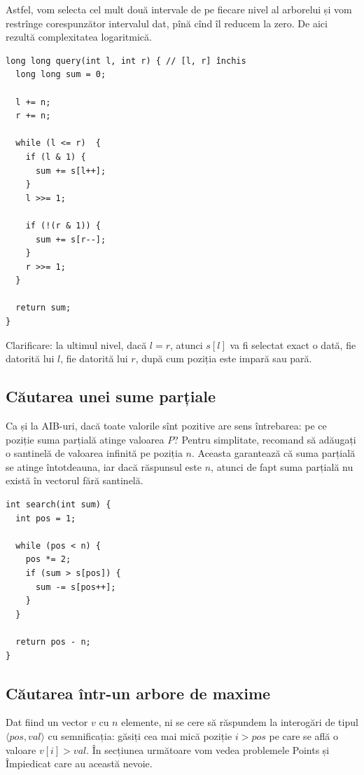 \documentclass[../main.tex]{subfiles}
\begin{document}
Astfel, vom selecta cel mult două intervale de pe fiecare nivel al arborelui și vom restrînge corespunzător intervalul dat, pînă cînd îl reducem la zero. De aici rezultă complexitatea logaritmică.

\begin{verbatim}
long long query(int l, int r) { // [l, r] închis
  long long sum = 0;

  l += n;
  r += n;

  while (l <= r)  {
    if (l & 1) {
      sum += s[l++];
    }
    l >>= 1;

    if (!(r & 1)) {
      sum += s[r--];
    }
    r >>= 1;
  }

  return sum;
}
\end{verbatim}

Clarificare: la ultimul nivel, dacă $l = r$, atunci $s[l]$ va fi selectat exact o dată, fie datorită lui $l$, fie datorită lui $r$, după cum poziția este impară sau pară.

\subsection{Căutarea unei sume parțiale}

Ca și la AIB-uri, dacă toate valorile sînt pozitive are sens întrebarea: pe ce poziție suma parțială atinge valoarea $P$? Pentru simplitate, recomand să adăugați o santinelă de valoarea infinită pe poziția $n$. Aceasta garantează că suma parțială se atinge întotdeauna, iar dacă răspunsul este $n$, atunci de fapt suma parțială nu există în vectorul fără santinelă.

\begin{verbatim}
int search(int sum) {
  int pos = 1;

  while (pos < n) {
    pos *= 2;
    if (sum > s[pos]) {
      sum -= s[pos++];
    }
  }

  return pos - n;
}
\end{verbatim}

\subsection{Căutarea într-un arbore de maxime}

Dat fiind un vector $v$ cu $n$ elemente, ni se cere să răspundem la interogări de tipul $\langle pos, val \rangle$ cu semnificația: găsiți cea mai mică poziție $i > pos$ pe care se află o valoare $v[i] > val$. În secțiunea următoare vom vedea problemele Points și Împiedicat care au această nevoie.
\end{document}
